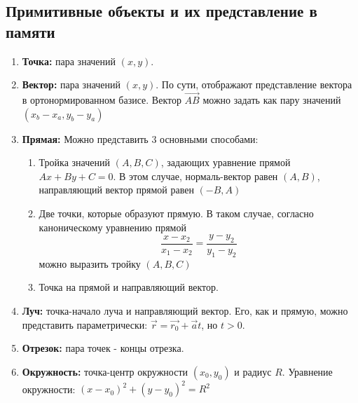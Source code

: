 \subsection*{Примитивные объекты и их представление в памяти}
\begin{enumerate}
    \item \textbf{Точка:} пара значений $(x, y)$.
    \item \textbf{Вектор:} пара значений $(x, y)$. По сути, отображают представление вектора в ортонормированном базисе.\newline
    Вектор $\Vec{AB}$ можно задать как пару значений $(x_b - x_a, y_b - y_a)$
    \item \textbf{Прямая:} Можно представить 3 основными способами: \begin{enumerate}
        \item Тройка значений $(A, B, C)$, задающих уравнение прямой $Ax+By+C = 0$.\newline
        В этом случае, нормаль-вектор равен $(A, B)$, направляющий вектор прямой равен $(-B, A)$
        \item Две точки, которые образуют прямую. В таком случае, согласно каноническому уравнению прямой \begin{equation*}
        \frac{x - x_2}{x_1 - x_2} = \frac{y - y_2}{y_1 - y_2}
        \end{equation*}
        можно выразить тройку $(A, B, C)$
        \item Точка на прямой и направляющий вектор.
    \end{enumerate}
    \item \textbf{Луч:} точка-начало луча и направляющий вектор. Его, как и прямую, можно представить параметрически: $\Vec{r} = \Vec{r_0} + \Vec{a}t$, но $t > 0$.
    \item \textbf{Отрезок:} пара точек - концы отрезка.
    \item \textbf{Окружность:} точка-центр окружности $(x_0, y_0)$ и радиус $R$. \newline
    Уравнение окружности: $(x - x_0)^2 + (y - y_0)^2 = R^2$
\end{enumerate}

